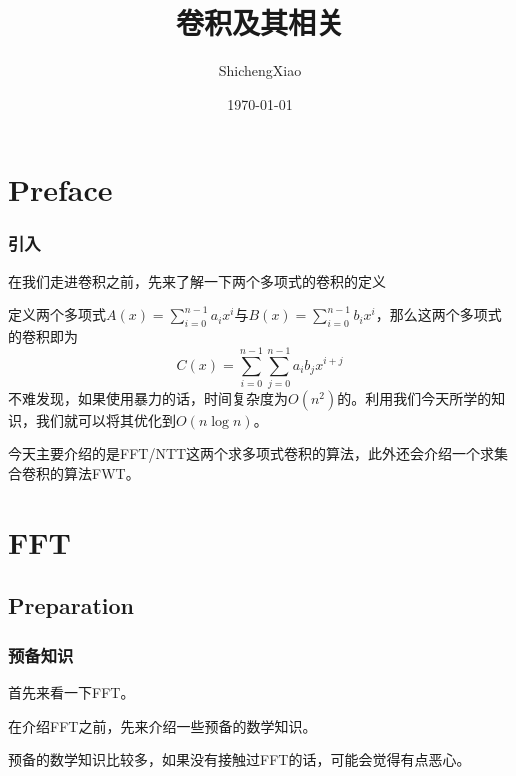 \documentclass[10pt]{beamer}
\begin{document}
	\begin{spacing}{1.2}

		\title[卷积及其相关]{卷积及其相关} %

		\author{ShichengXiao} %
		\date{\today} %

		\begin{frame}
			\titlepage %
		\end{frame}

		\section{Preface}
		\begin{frame}
			\frametitle{引入} 

			在我们走进卷积之前，先来了解一下两个多项式的卷积的定义 \pause

			定义两个多项式$\displaystyle A(x) = \sum_{i=0}^{n-1} a_ix^i$与$\displaystyle B(x) = \sum_{i=0}^{n-1} b_ix^i$，那么这两个多项式的卷积即为
			$$C(x) = \sum_{i=0}^{n-1} \sum_{j=0}^{n - 1} a_ib_j x^{i + j}$$ \pause
			不难发现，如果使用暴力的话，时间复杂度为$O(n^2)$的。利用我们今天所学的知识，我们就可以将其优化到$O(n\log n)$。 \pause

			今天主要介绍的是FFT/NTT这两个求多项式卷积的算法，此外还会介绍一个求集合卷积的算法FWT。

		\end{frame}

		\section{FFT}

		\subsection{Preparation}

		\begin{frame}
			\frametitle{预备知识}

			首先来看一下FFT。 \pause

			在介绍FFT之前，先来介绍一些预备的数学知识。 \pause

			预备的数学知识比较多，如果没有接触过FFT的话，可能会觉得有点恶心。 \pause


\end{frame}
\end{spacing}
\end{document}
